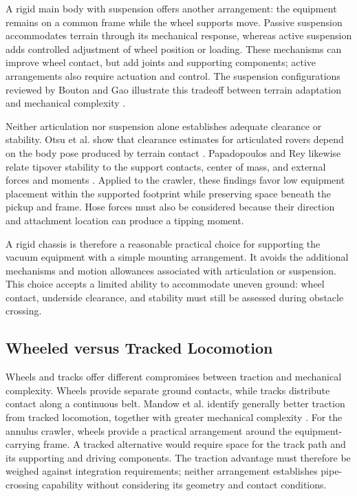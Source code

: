 A rigid main body with suspension offers another arrangement: the equipment remains on a common frame while the wheel supports move. Passive suspension accommodates terrain through its mechanical response, whereas active suspension adds controlled adjustment of wheel position or loading. These mechanisms can improve wheel contact, but add joints and supporting components; active arrangements also require actuation and control. The suspension configurations reviewed by Bouton and Gao illustrate this tradeoff between terrain adaptation and mechanical complexity \citep{bouton2023Marcel}.

Neither articulation nor suspension alone establishes adequate clearance or stability. Otsu et al. show that clearance estimates for articulated rovers depend on the body pose produced by terrain contact \citep{otsu2020Clearance}. Papadopoulos and Rey likewise relate tipover stability to the support contacts, center of mass, and external forces and moments \citep{papadopoulos1996Stability}. Applied to the crawler, these findings favor low equipment placement within the supported footprint while preserving space beneath the pickup and frame. Hose forces must also be considered because their direction and attachment location can produce a tipping moment.

A rigid chassis is therefore a reasonable practical choice for supporting the vacuum equipment with a simple mounting arrangement. It avoids the additional mechanisms and motion allowances associated with articulation or suspension. This choice accepts a limited ability to accommodate uneven ground: wheel contact, underside clearance, and stability must still be assessed during obstacle crossing.

\subsection{Wheeled versus Tracked Locomotion}
\label{sec:wheeled-tracked-locomotion}
Wheels and tracks offer different compromises between traction and mechanical complexity. Wheels provide separate ground contacts, while tracks distribute contact along a continuous belt. Mandow et al. identify generally better traction from tracked locomotion, together with greater mechanical complexity \citep{mandow2007Kinematics}. For the annulus crawler, wheels provide a practical arrangement around the equipment-carrying frame. A tracked alternative would require space for the track path and its supporting and driving components. The traction advantage must therefore be weighed against integration requirements; neither arrangement establishes pipe-crossing capability without considering its geometry and contact conditions.

